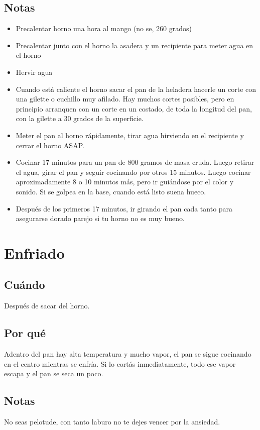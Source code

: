 \documentclass[10pt,a4paper]{article}
\begin{document}
\subsection*{Notas}
  \begin{itemize}
    \item Precalentar horno una hora al mango (no se, 260 grados)
    \item Precalentar junto con el horno la asadera y un recipiente para meter
      agua en el horno
    \item Hervir agua
    \item Cuando está caliente el horno sacar el pan de la heladera hacerle un
      corte con una gilette o cuchillo muy afilado. Hay muchos cortes posibles,
      pero en principio arranquen con un corte en un costado, de toda la
      longitud del pan, con la gilette a 30 grados de la superficie.

    \item Meter el pan al horno rápidamente, tirar agua hirviendo en el
      recipiente y cerrar el horno ASAP.
    \item Cocinar 17 minutos para un pan de 800 gramos de masa cruda. Luego
      retirar el agua, girar el pan y seguir cocinando por otros 15 minutos.
      Luego cocinar aproximadamente 8 o 10 minutos más, pero ir guiándose por el
      color y sonido. Si se golpea en la base, cuando está listo suena hueco.
    \item Después de los primeros 17 minutos, ir girando el pan cada tanto para
      asegurarse dorado parejo si tu horno no es muy bueno.
  \end{itemize}

\section{Enfriado}
\subsection*{Cuándo}
Después de sacar del horno.
\subsection*{Por qué}
Adentro del pan hay alta temperatura y mucho vapor, el pan se sigue cocinando en
el centro mientras se enfría. Si lo cortás inmediatamente, todo ese vapor escapa
y el pan se seca un poco.
\subsection*{Notas}
No seas pelotude, con tanto laburo no te dejes vencer por la ansiedad.
\end{document}
